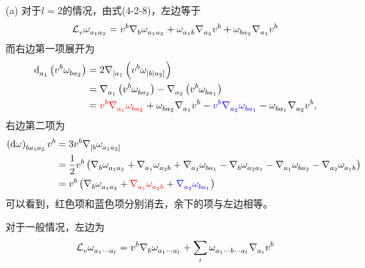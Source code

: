 \begin{xiti}
    \begin{zm}
    	\begin{enumerate}[listparindent=2em]
    		\item[(a)] 对于$l=2 $的情况，由式(4-2-8)，左边等于
    		\begin{displaymath}
    		\Ld{v} \tensor{\omega}{_{a_1 a_2}} = \tensor{v}{^b} \Nabla{b} \tensor{\omega}{_{a_1 a_2}} + \tensor{\omega}{_{a_1 b}} \Nabla{a_2} \tensor{v}{^b} + \tensor{\omega}{_{b a_2}} \Nabla{a_1} \tensor{v}{^b}
    		\end{displaymath}
    		而右边第一项展开为
    		\begin{align*}
    		\dd\indices{_{a_1}} \left( \tensor{v}{^b} \tensor{\omega}{_{b a_2}} \right) &= 2 \Nabla{[a_1} \left( \tensor{v}{^b} \tensor{\omega}{_{|b|a_2]}} \right)\\
    		&= \Nabla{a_1} \left( \tensor{v}{^b} \tensor{\omega}{_{b a_2}} \right) - \Nabla{a_2} \left( \tensor{v}{^b} \tensor{\omega}{_{b a_1}} \right)\\
    		&= {\color{red} \tensor{v}{^b} \Nabla{a_1} \tensor{\omega}{_{b a_2}} } + \tensor{\omega}{_{b a_2}} \Nabla{a_1} \tensor{v}{^b} - {\color{blue} \tensor{v}{^b} \Nabla{a_2} \tensor{\omega}{_{b a_1}}} - \tensor{\omega}{_{b a_1}} \Nabla{a_2} \tensor{v}{^b},
    		\end{align*}
    		右边第二项为
    		\begin{align*}
    		\tensor{\left(\dd{\omega}\right)}{_{b a_1 a_2}} \tensor{v}{^b} &= 3 \tensor{v}{^b} \Nabla{[b} \tensor{\omega}{_{a_1 a_2]}}\\
    		&= \frac{1}{2} \tensor{v}{^b} \left( \Nabla{b} \tensor{\omega}{_{a_1 a_2}} + \Nabla{a_1} \tensor{\omega}{_{a_2 b}} + \Nabla{a_2} \tensor{\omega}{_{b a_1}} - \Nabla{b} \tensor{\omega}{_{a_2 a_1}} - \Nabla{a_1} \tensor{\omega}{_{b a_2}} - \Nabla{a_2} \tensor{\omega}{_{a_1 b}} \right)\\
    		&= \tensor{v}{^b} \left( \Nabla{b} \tensor{\omega}{_{a_1 a_2}} + {\color{red} \Nabla{a_1} \tensor{\omega}{_{a_2 b}}} + {\color{blue} \Nabla{a_2} \tensor{\omega}{_{b a_1}} } \right)
    		\end{align*}
    		可以看到，红色项和蓝色项分别消去，余下的项与左边相等。

    		对于一般情况，左边为
    		\begin{displaymath}
    		\Ld{v} \tensor{\omega}{_{a_1 \cdots a_l}} = \tensor{v}{^b} \Nabla{b} \tensor{\omega}{_{a_1 \cdots a_l}} + \sum_{i} \tensor{\omega}{_{a_1 \cdots b \cdots a_l}} \Nabla{a_i} \tensor{v}{^b}
    		\end{displaymath}


\end{enumerate}
\end{zm}
\end{xiti}
